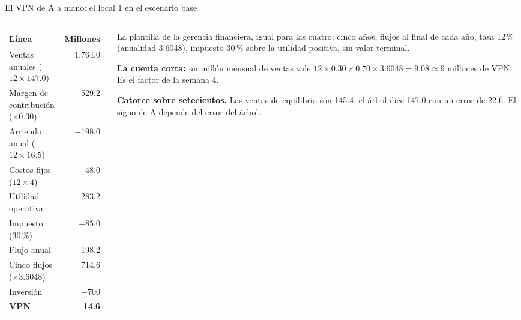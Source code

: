 \documentclass{beamer}
\begin{document}
\begin{frame}{El VPN de A a mano: el local 1 en el escenario base}
\begin{columns}[T]
\begin{column}{0.5\textwidth}
{\small
\begin{tabular}{@{}L{3.6cm}r@{}}
\toprule
Línea & Millones \\
\midrule
Ventas anuales ($12 \times 147.0$) & 1.764.0 \\
Margen de contribución ($\times 0.30$) & 529.2 \\
Arriendo anual ($12 \times 16.5$) & $-198.0$ \\
Costos fijos ($12 \times 4$) & $-48.0$ \\
Utilidad operativa & 283.2 \\
Impuesto (30\,\%) & $-85.0$ \\
Flujo anual & 198.2 \\
Cinco flujos ($\times 3.6048$) & 714.6 \\
Inversión & $-700$ \\
\midrule
\textbf{VPN} & \textbf{14.6} \\
\bottomrule
\end{tabular}}
\end{column}
\begin{column}{0.5\textwidth}
\small
La plantilla de la gerencia financiera, igual para las cuatro: cinco años, flujos al final de cada año, tasa 12\,\% (anualidad 3.6048), impuesto 30\,\% sobre la utilidad positiva, sin valor terminal.

\medskip
\textbf{La cuenta corta:} un millón mensual de ventas vale $12 \times 0.30 \times 0.70 \times 3.6048 = 9.08 \approx 9$ millones de VPN. Es el factor de la semana 4.

\medskip
\textbf{Catorce sobre setecientos.} Las ventas de equilibrio son 145.4; el árbol dice 147.0 con un error de 22.6. El signo de A depende del error del árbol.
\end{column}
\end{columns}
\end{frame}
\end{document}
